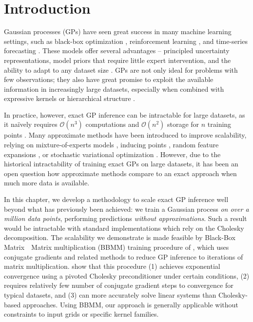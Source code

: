 \section{Introduction}
Gaussian processes (GPs) have seen great success in many machine learning settings, such as black-box optimization \citep{snoek2012practical}, reinforcement learning \cite{deisenroth2011pilco,deisenroth2015gaussian}, and time-series forecasting \cite{roberts2013gaussian}.
These models offer several advantages -- principled uncertainty representations, model priors that require little expert intervention, and the ability to adapt to any dataset size \citep{rasmussen2001occam,rasmussen2006gaussian}.
GPs are not only ideal for problems with few observations; they also have great
promise to exploit the available information in increasingly large datasets,
especially when combined with expressive kernels \cite{wilson2013gaussian} or
hierarchical structure \cite{wilson2012gaussian, damianou2013deep,wilson2016deep,salimbeni2017doubly}.

In practice, however, exact GP inference can be intractable for large datasets, as it na\"ively requires $\mathcal{O}(n^3)$ computations and $\mathcal{O}(n^2)$ storage for $n$ training points \cite{rasmussen2006gaussian}.
Many approximate methods have been introduced to improve scalability, relying on mixture-of-experts models \cite{deisenroth2015distributed}, inducing points \citep{snelson2006sparse,titsias2009variational,wilson2015kernel,gardner2018product},
random feature expansions \cite{rahimi2008random,le2013fastfood,yang2015carte},
or stochastic variational optimization \citep{hensman2013gaussian,hensman2015scalable,wilson2016stochastic,cheng2017variational,salimbeni2018orthogonally}.
However, due to the historical intractability of training exact GPs on large datasets, it
has been an open question how approximate methods compare to an exact approach when much more data is available.

In this chapter, we develop a methodology to scale exact GP inference well beyond what has previously been achieved:
we train a Gaussian process \emph{on over a million data points}, performing predictions \emph{without approximations}.
Such a result would be intractable with standard implementations which rely on the Cholesky decomposition.
The scalability we demonstrate is made feasible by Black-Box Matrix~\texttimes~Matrix multiplication (BBMM) training procedure of \citet{gardner2018gpytorch}, which uses conjugate gradients and related methods to reduce GP inference to iterations of matrix multiplication.
\citet{gardner2018gpytorch} show that this procedure (1) achieves exponential convergence using a pivoted Cholesky preconditioner under certain conditions, (2) requires relatively few number of conjugate gradient steps to convergence for typical datasets, and (3) can more accurately solve linear systems than Cholesky-based approaches. Using BBMM, our approach is generally applicable without constraints to input grids or specific kernel families.

